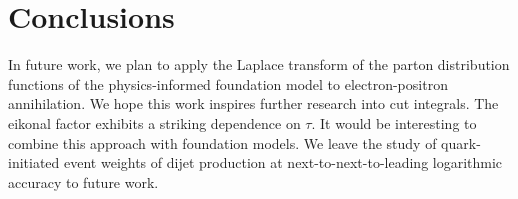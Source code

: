 \section{Conclusions}\label{sec:conclusions}

In future work, we plan to apply the Laplace transform of the parton
distribution functions of the physics-informed foundation model to
electron-positron annihilation. We hope this work inspires further
research into cut integrals. The eikonal factor exhibits a striking
dependence on $\tau$. It would be interesting to combine this approach
with foundation models. We leave the study of quark-initiated event
weights of dijet production at next-to-next-to-leading logarithmic
accuracy to future work.


